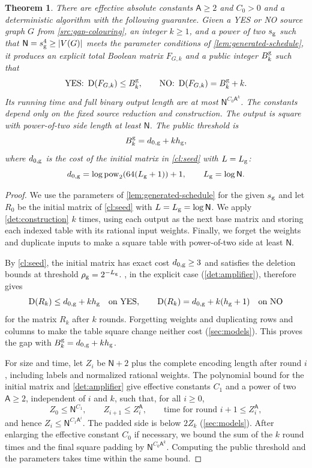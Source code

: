 \documentclass[11pt,letterpaper]{article} \usepackage[utf8]{inputenc}
\theoremstyle{plain} \newtheorem{theorem}{Theorem}[section]
\theoremstyle{definition} \newaliascnt{definition}{theorem}
\newcommand{\D}{\operatorname{D}}
\begin{document}
\begin{theorem}\label{det:reduction}
There are effective absolute constants \(\mathsf A\ge2\) and \(C_0>0\) and a
deterministic algorithm with the following guarantee. Given a YES or NO
source graph \(G\) from \cref{src:gap-colouring}, an integer \(k\ge1\), and a power of two
\(s_{\rm g}\) such that \(\mathsf N=s_{\rm g}^4\ge|V(G)|\) meets the parameter conditions
of \cref{lem:generated-schedule}, it produces an explicit total Boolean matrix
\(F_{G,k}\) and a public integer \(B_k^{\rm g}\) such that
\[
\text{YES: }\D(F_{G,k})\le B_k^{\rm g},\qquad \text{NO: }\D(F_{G,k})=B_k^{\rm
g}+k.
\]
Its running time and full
binary output length are at most \(\mathsf N^{C_0\mathsf A^k}\). The constants
depend only on the fixed source reduction and construction. The output is
square with power-of-two side length at least \(\mathsf N\). The public threshold is
\[
B_k^{\rm g}=d_{0,\rm g}+kh_{\rm g},
\]
where \(d_{0,\rm g}\) is the cost of the initial matrix in \cref{cl:seed}
with \(L=L_{\rm g}\):
\[
d_{0,\rm g}=\log\operatorname{pow}_2(64(L_{\rm g}+1))+1,\qquad L_{\rm
g}=\log\mathsf N.
\]
\end{theorem}

\begin{proof}
We use the parameters of \cref{lem:generated-schedule} for the given $s_{\rm g}$ and let $R_0$ be the
initial matrix of \cref{cl:seed} with $L=L_{\rm g}=\log\mathsf N$. We apply
\cref{det:construction} $k$ times, using each output as the next base matrix
and storing each indexed table with its rational
input weights. Finally, we forget the weights
and duplicate inputs to make a square table with power-of-two side at least $\mathsf N$.

By \cref{cl:seed}, the initial matrix has exact cost $d_{0,\rm g}\ge3$ and
satisfies the deletion bounds at threshold $\rho_{\rm g}=2^{-L_{\rm g}}$.
, in the explicit case (\cref{det:amplifier}), therefore gives
\[
\D(R_k)\le d_{0,\rm g}+kh_{\rm g}\quad\text{on YES},\qquad
\D(R_k)=d_{0,\rm g}+k(h_{\rm g}+1)\quad\text{on NO}
\]
for the matrix $R_k$ after $k$ rounds. Forgetting weights and duplicating rows
and columns to make the table square change neither cost (\cref{sec:models}). This proves the gap
with $B_k^{\rm g}=d_{0,\rm g}+kh_{\rm g}$.

For size and time, let $Z_i$ be $\mathsf N+2$ plus the complete encoding
length after round $i$, including labels and normalized rational weights. The polynomial
bound for the initial matrix and \cref{det:amplifier} give effective constants $C_1$ and a
power of two $\mathsf A\ge2$, independent of $i$ and $k$, such that, for all $i\ge0$,
\[
Z_0\le\mathsf N^{C_1},\qquad
Z_{i+1}\le Z_i^{\mathsf A},\qquad \text{time for round }i+1\le Z_i^{\mathsf A},
\]
and hence $Z_i\le\mathsf N^{C_1\mathsf A^i}$.
The padded side is below $2Z_k$ (\cref{sec:models}). After enlarging the effective constant $C_0$ if necessary, we bound the sum of
the $k$ round times and the final square padding by $\mathsf N^{C_0\mathsf A^k}$.
Computing the public threshold and the parameters takes time within the same bound.
\end{proof}
\end{document}
